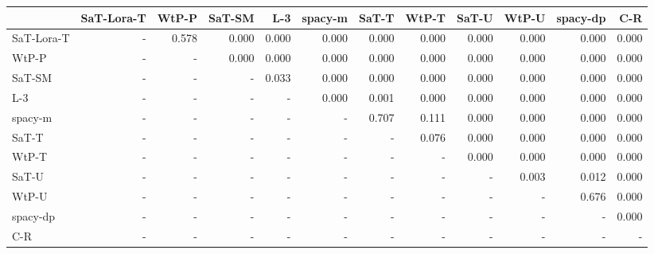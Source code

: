 \begin{tabular}{lrrrrrrrrrrr}
\toprule
 & SaT-Lora-T & WtP-P & SaT-SM & L-3 & spacy-m & SaT-T & WtP-T & SaT-U & WtP-U & spacy-dp & C-R \\
\midrule
SaT-Lora-T & - & 0.578 & 0.000 & 0.000 & 0.000 & 0.000 & 0.000 & 0.000 & 0.000 & 0.000 & 0.000 \\
WtP-P & - & - & 0.000 & 0.000 & 0.000 & 0.000 & 0.000 & 0.000 & 0.000 & 0.000 & 0.000 \\
SaT-SM & - & - & - & 0.033 & 0.000 & 0.000 & 0.000 & 0.000 & 0.000 & 0.000 & 0.000 \\
L-3 & - & - & - & - & 0.000 & 0.001 & 0.000 & 0.000 & 0.000 & 0.000 & 0.000 \\
spacy-m & - & - & - & - & - & 0.707 & 0.111 & 0.000 & 0.000 & 0.000 & 0.000 \\
SaT-T & - & - & - & - & - & - & 0.076 & 0.000 & 0.000 & 0.000 & 0.000 \\
WtP-T & - & - & - & - & - & - & - & 0.000 & 0.000 & 0.000 & 0.000 \\
SaT-U & - & - & - & - & - & - & - & - & 0.003 & 0.012 & 0.000 \\
WtP-U & - & - & - & - & - & - & - & - & - & 0.676 & 0.000 \\
spacy-dp & - & - & - & - & - & - & - & - & - & - & 0.000 \\
C-R & - & - & - & - & - & - & - & - & - & - & - \\
\bottomrule
\end{tabular}

